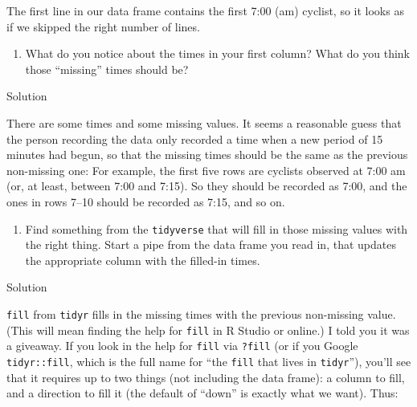 \documentclass[]{tufte-book}
\newenvironment{Shaded}{}{}
\newcommand{\KeywordTok}[1]{\textcolor[rgb]{0.00,0.44,0.13}{\textbf{#1}}}
\newcommand{\NormalTok}[1]{#1}
\newcommand{\OperatorTok}[1]{\textcolor[rgb]{0.40,0.40,0.40}{#1}}
\newcommand{\StringTok}[1]{\textcolor[rgb]{0.25,0.44,0.63}{#1}}
\providecommand{\tightlist}{%
  \setlength{\itemsep}{0pt}\setlength{\parskip}{0pt}}
\theoremstyle{definition}
\theoremstyle{definition}
\theoremstyle{definition}
\theoremstyle{remark}
\begin{document}
The first line in our data frame contains the first 7:00 (am) cyclist,
so it looks as if we skipped the right number of lines.

\begin{enumerate}
\def\labelenumi{(\alph{enumi})}
\setcounter{enumi}{2}
\tightlist
\item
  What do you notice about the times in your first column? What do you
  think those ``missing'' times should be?
\end{enumerate}

Solution

There are some times and some missing values. It seems a reasonable
guess that the person recording the data only recorded a time when a new
period of 15 minutes had begun, so that the missing times should be the
same as the previous non-missing one: For example, the first five rows
are cyclists observed at 7:00 am (or, at least, between 7:00 and 7:15).
So they should be recorded as 7:00, and the ones in rows 7--10 should be
recorded as 7:15, and so on.

\begin{enumerate}
\def\labelenumi{(\alph{enumi})}
\setcounter{enumi}{3}
\tightlist
\item
  Find something from the \texttt{tidyverse} that will fill
   in those missing values with the
  right thing. Start a pipe from the data frame you read in, that
  updates the appropriate column with the filled-in times.
\end{enumerate}

Solution

\texttt{fill} from \texttt{tidyr} fills in the missing times with the
previous non-missing value. (This will mean finding the help for
\texttt{fill} in R Studio or online.) I told you it was a giveaway. If
you look in the help for \texttt{fill} via \texttt{?fill} (or if you
Google \texttt{tidyr::fill}, which is the full name for ``the
\texttt{fill} that lives in \texttt{tidyr}''), you'll see that it
requires up to two things (not including the data frame): a column to
fill, and a direction to fill it (the default of ``down'' is exactly
what we want). Thus:

\begin{Shaded}
\end{Shaded}
\end{document}
